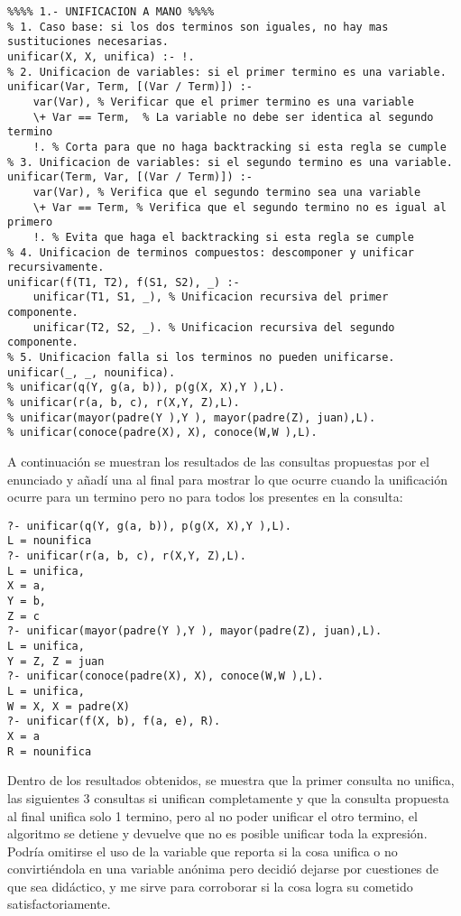 \documentclass[11pt, letterpaper]{article}
\begin{document}
\begin{lstlisting}
%%%% 1.- UNIFICACION A MANO %%%%
% 1. Caso base: si los dos terminos son iguales, no hay mas sustituciones necesarias.
unificar(X, X, unifica) :- !.
% 2. Unificacion de variables: si el primer termino es una variable.
unificar(Var, Term, [(Var / Term)]) :-
    var(Var), % Verificar que el primer termino es una variable
    \+ Var == Term,  % La variable no debe ser identica al segundo termino
    !. % Corta para que no haga backtracking si esta regla se cumple
% 3. Unificacion de variables: si el segundo termino es una variable.
unificar(Term, Var, [(Var / Term)]) :-
    var(Var), % Verifica que el segundo termino sea una variable
    \+ Var == Term, % Verifica que el segundo termino no es igual al primero
    !. % Evita que haga el backtracking si esta regla se cumple
% 4. Unificacion de terminos compuestos: descomponer y unificar recursivamente.
unificar(f(T1, T2), f(S1, S2), _) :-
    unificar(T1, S1, _), % Unificacion recursiva del primer componente.
    unificar(T2, S2, _). % Unificacion recursiva del segundo componente.
% 5. Unificacion falla si los terminos no pueden unificarse.
unificar(_, _, nounifica).
% unificar(q(Y, g(a, b)), p(g(X, X),Y ),L).
% unificar(r(a, b, c), r(X,Y, Z),L).
% unificar(mayor(padre(Y ),Y ), mayor(padre(Z), juan),L).
% unificar(conoce(padre(X), X), conoce(W,W ),L).
\end{lstlisting}

A continuación se muestran los resultados de las consultas propuestas por el enunciado y añadí una al final para mostrar lo que ocurre cuando la unificación ocurre para un termino pero no para todos los presentes en la consulta:

\begin{lstlisting}
?- unificar(q(Y, g(a, b)), p(g(X, X),Y ),L).
L = nounifica
?- unificar(r(a, b, c), r(X,Y, Z),L).
L = unifica,
X = a,
Y = b,
Z = c
?- unificar(mayor(padre(Y ),Y ), mayor(padre(Z), juan),L).
L = unifica,
Y = Z, Z = juan
?- unificar(conoce(padre(X), X), conoce(W,W ),L).
L = unifica,
W = X, X = padre(X)
?- unificar(f(X, b), f(a, e), R).
X = a
R = nounifica
\end{lstlisting}

Dentro de los resultados obtenidos, se muestra que la primer consulta no unifica, las siguientes 3 consultas si unifican completamente y que la consulta propuesta al final unifica solo 1 termino, pero al no poder unificar el otro termino, el algoritmo se detiene y devuelve que no es posible unificar toda la expresión.
Podría omitirse el uso de la variable que reporta si la cosa unifica o no convirtiéndola en una variable anónima  pero decidió dejarse por cuestiones de que sea didáctico, y me sirve para corroborar si la cosa logra su cometido satisfactoriamente.
\end{document}
